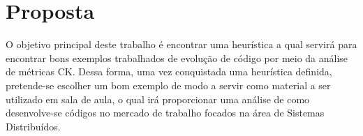 
\chapter{Proposta}\label{cap:proposta}
O objetivo principal deste trabalho é encontrar uma heurística a qual servirá para encontrar bons exemplos trabalhados de evolução de código por meio da análise de métricas CK. Dessa forma, uma vez conquistada uma heurística definida, pretende-se escolher um bom exemplo de modo a servir como material a ser utilizado em sala de aula, o qual irá proporcionar uma análise de como desenvolve-se códigos no mercado de trabalho focados na área de Sistemas Distribuídos.